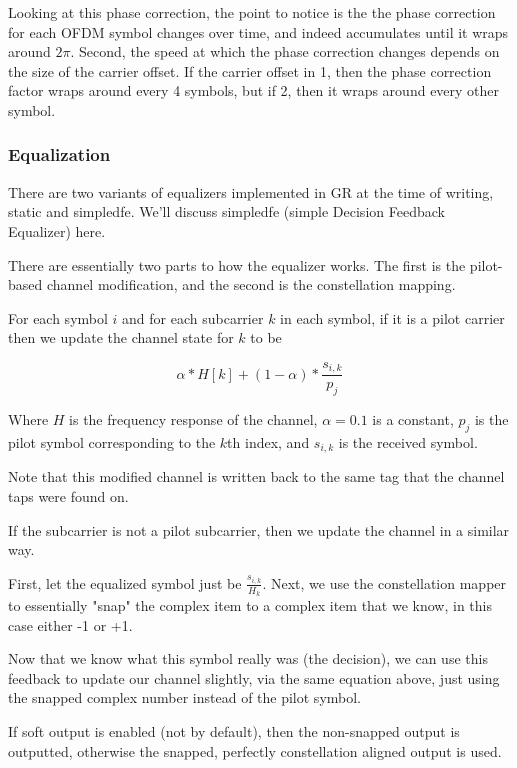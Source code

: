 \documentclass[11pt]{article}
\begin{document}
Looking at this phase correction, the point to notice is the the phase
correction for each OFDM symbol changes over time, and indeed
accumulates until it wraps around \(2\pi\). Second, the speed at which
the phase correction changes depends on the size of the carrier
offset. If the carrier offset in 1, then the phase correction factor
wraps around every 4 symbols, but if 2, then it wraps around every
other symbol.

\subsubsection{Equalization}
\label{sec:orgf89caec}
There are two variants of equalizers implemented in GR at the time of
writing, static and simpledfe. We'll discuss simpledfe (simple
Decision Feedback Equalizer) here.

There are essentially two parts to how the equalizer works. The first
is the pilot-based channel modification, and the second is the
constellation mapping.

For each symbol \(i\) and for each subcarrier \(k\) in each symbol, if it is a
pilot carrier then we update the channel state for \(k\) to be

\begin{equation}
\alpha * H[k] + (1-\alpha) * \frac{s_{i, k}}{p_j}
\end{equation}

Where \(H\) is the frequency response of the channel, \(\alpha = 0.1\) is
a constant, \(p_j\) is the pilot symbol corresponding to the \(k\)th
index, and \(s_{i,k}\) is the received symbol.

Note that this modified channel is written back to the same tag that
the channel taps were found on.

If the subcarrier is not a pilot subcarrier, then we update the
channel in a similar way.

First, let the equalized symbol just be \(\frac{s_{i, k}}{H_k}\). Next,
we use the constellation mapper to essentially "snap" the complex item
to a complex item that we know, in this case either -1 or +1.

Now that we know what this symbol really was (the decision), we can
use this feedback to update our channel slightly, via the same
equation above, just using the snapped complex number instead of the
pilot symbol.

If soft output is enabled (not by default), then the non-snapped
output is outputted, otherwise the snapped, perfectly constellation
aligned output is used.
\end{document}
